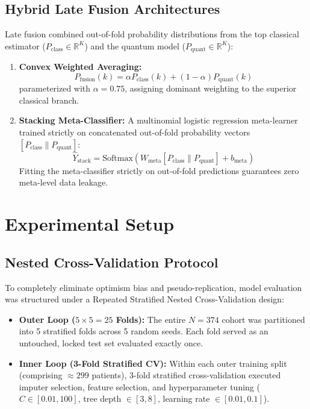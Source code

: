 \documentclass[conference]{IEEEtran}
\begin{document}
\subsection{Hybrid Late Fusion Architectures}
Late fusion combined out-of-fold probability distributions from the top classical estimator ($P_{\text{class}} \in \mathbb{R}^K$) and the quantum model ($P_{\text{quant}} \in \mathbb{R}^K$):
\begin{enumerate}
    \item \textbf{Convex Weighted Averaging:}
    \begin{equation}
    P_{\text{fusion}}(k) = \alpha P_{\text{class}}(k) + (1-\alpha) P_{\text{quant}}(k)
    \end{equation}
    parameterized with $\alpha = 0.75$, assigning dominant weighting to the superior classical branch.
    \item \textbf{Stacking Meta-Classifier:} A multinomial logistic regression meta-learner trained strictly on concatenated out-of-fold probability vectors $[P_{\text{class}} \parallel P_{\text{quant}}]$:
    \begin{equation}
    \hat{Y}_{\text{stack}} = \text{Softmax}\left( W_{\text{meta}} [P_{\text{class}} \parallel P_{\text{quant}}] + b_{\text{meta}} \right)
    \end{equation}
    Fitting the meta-classifier strictly on out-of-fold predictions guarantees zero meta-level data leakage.
\end{enumerate}

\section{Experimental Setup}

\subsection{Nested Cross-Validation Protocol}
To completely eliminate optimism bias and pseudo-replication, model evaluation was structured under a Repeated Stratified Nested Cross-Validation design:
\begin{itemize}
    \item \textbf{Outer Loop ($5 \times 5 = 25$ Folds):} The entire $N = 374$ cohort was partitioned into 5 stratified folds across 5 random seeds. Each fold served as an untouched, locked test set evaluated exactly once.
    \item \textbf{Inner Loop (3-Fold Stratified CV):} Within each outer training split (comprising $\approx 299$ patients), 3-fold stratified cross-validation executed imputer selection, feature selection, and hyperparameter tuning ($C \in [0.01, 100]$, tree depth $\in [3, 8]$, learning rate $\in [0.01, 0.1]$).
\end{itemize}
\end{document}
